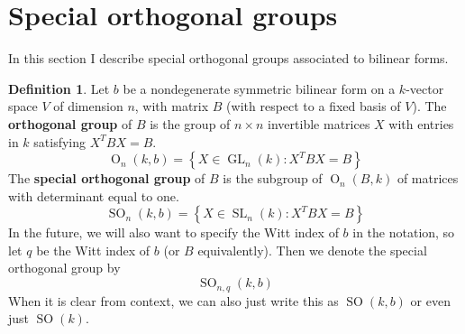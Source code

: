 \documentclass[12pt]{article}
\theoremstyle{definition}
\newtheorem{definition}[theorem]{Definition}
\numberwithin{theorem}{subsection}
\newcommand{\sig}{\sigma}
\newcommand{\lb}{\left\{}
\newcommand{\rb}{\right\}}
\newcommand{\tbf}{\textbf}
\newcommand{\noi}{\noindent}
\newcommand{\inv}{^{-1}}
\DeclareMathOperator{\SL}{SL}
\DeclareMathOperator{\GL}{GL}
\DeclareMathOperator{\OO}{O}
\DeclareMathOperator{\SO}{SO}
\begin{document}
%
%

\newpage
\section{Special orthogonal groups}

In this section I describe special orthogonal groups associated to bilinear forms. 

\begin{definition}
Let $b$ be a nondegenerate symmetric bilinear form on a $k$-vector space $V$ of dimension $n$, with matrix $B$ (with respect to a fixed basis of $V$). The \tbf{orthogonal group} of $B$ is the group of $n \times n$ invertible matrices $X$ with entries in $k$ satisfying $X^T BX = B$.
\[
	\OO_n(k,b) = \lb X \in \GL_n(k) : X^T BX = B \rb
\]
The \tbf{special orthogonal group} of $B$ is the subgroup of $\OO_n(B,k)$ of matrices with determinant equal to one.
\[
	\SO_n(k,b) = \lb X \in \SL_n(k) : X^T BX = B \rb
\]
In the future, we will also want to specify the Witt index of $b$ in the notation, so let $q$ be the Witt index of $b$ (or $B$ equivalently). Then we denote the special orthogonal group by
\[
	\SO_{n,q}(k,b)
\]
When it is clear from context, we can also just write this as $\SO(k,b)$ or even just $\SO(k)$.
\end{definition}
\end{document}
